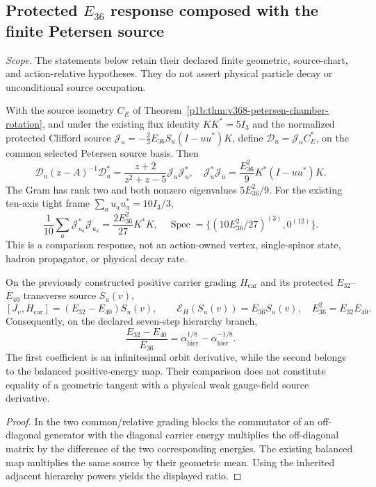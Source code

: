 \documentclass[12pt,a4paper]{article}
\begin{document}
\subsection{Protected $E_{36}$ response composed with the finite Petersen source}
\noindent\emph{Scope.} The statements below retain their declared finite geometric, source-chart, and action-relative hypotheses. They do not assert physical particle decay or unconditional source occupation.
\begin{corollary}
\label{p3c:cor:v368-petersen-chamber-e36-response}
With the source isometry $C_E$ of Theorem~\ref{p1b:thm:v368-petersen-chamber-rotation},
and under the existing flux identity $KK^*=5I_3$ and the normalized
protected Clifford source
$\mathcal J_u=-\frac23E_{36}S_u(I-uu^*)K$, define
$\mathcal D_u=\mathcal J_uC_E^*$, on the common selected
Petersen source basis. Then
\[
 \mathcal D_u(z-A)^{-1}\mathcal D_u^*
 =\frac{z+2}{z^2+z-5}\mathcal J_u\mathcal J_u^*,
 \quad
 \mathcal J_u^*\mathcal J_u=\frac{E_{36}^2}{9}K^*(I-uu^*)K.
\]
The Gram has rank two and both nonzero eigenvalues $5E_{36}^2/9$.
For the existing ten-axis tight frame $\sum_a u_au_a^*=10I_3/3$,
\[
 \frac1{10}\sum_a\mathcal J_{u_a}^*\mathcal J_{u_a}
 =\frac{2E_{36}^2}{27}K^*K,
 \quad\operatorname{Spec}=\{(10E_{36}^2/27)^{(3)},0^{(12)}\}.
\]
This is a comparison response, not an action-owned vertex, single-spinor
state, hadron propagator, or physical decay rate.
\end{corollary}

\begin{proposition}
\label{p3c:prop:v368-orbit-balanced-distinction}
On the previously constructed positive carrier grading $H_{\mathrm{car}}$
and its protected $E_{32}$--$E_{40}$ transverse source $S_u(v)$,
\[
 [J_v,H_{\mathrm{car}}]=(E_{32}-E_{40})S_u(v),\qquad
 \mathscr E_H(S_u(v))=E_{36}S_u(v),\quad E_{36}^2=E_{32}E_{40}.
\]
Consequently, on the declared seven-step hierarchy branch,
\[
 \frac{E_{32}-E_{40}}{E_{36}}
 =\alpha_{\mathrm{hier}}^{1/8}-\alpha_{\mathrm{hier}}^{-1/8}.
\]
The first coefficient is an infinitesimal orbit derivative, while the
second belongs to the balanced positive-energy map. Their comparison
does not constitute equality of a geometric tangent with a physical
weak gauge-field source derivative.
\end{proposition}
\begin{proof}
In the two common/relative grading blocks the commutator
of an off-diagonal generator with the diagonal carrier energy
multiplies the off-diagonal matrix by the difference of the two
corresponding energies. The existing balanced map multiplies the
same source by their geometric mean. Using the inherited adjacent
hierarchy powers yields the displayed ratio.
\end{proof}
\end{document}

